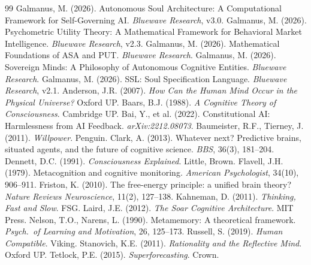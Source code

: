 \documentclass[12pt,a4paper]{article}
\theoremstyle{plain}
\theoremstyle{definition}
\theoremstyle{remark}
\begin{document}
\begin{thebibliography}{99}
 Galmanus, M. (2026). Autonomous Soul Architecture: A Computational Framework for Self-Governing AI. \textit{Bluewave Research}, v3.0.
 Galmanus, M. (2026). Psychometric Utility Theory: A Mathematical Framework for Behavioral Market Intelligence. \textit{Bluewave Research}, v2.3.
 Galmanus, M. (2026). Mathematical Foundations of ASA and PUT. \textit{Bluewave Research}.
 Galmanus, M. (2026). Sovereign Minds: A Philosophy of Autonomous Cognitive Entities. \textit{Bluewave Research}.
 Galmanus, M. (2026). SSL: Soul Specification Language. \textit{Bluewave Research}, v2.1.
 Anderson, J.R. (2007). \textit{How Can the Human Mind Occur in the Physical Universe?} Oxford UP.
 Baars, B.J. (1988). \textit{A Cognitive Theory of Consciousness}. Cambridge UP.
 Bai, Y., et al. (2022). Constitutional AI: Harmlessness from AI Feedback. \textit{arXiv:2212.08073}.
 Baumeister, R.F., Tierney, J. (2011). \textit{Willpower}. Penguin.
 Clark, A. (2013). Whatever next? Predictive brains, situated agents, and the future of cognitive science. \textit{BBS}, 36(3), 181--204.
 Dennett, D.C. (1991). \textit{Consciousness Explained}. Little, Brown.
 Flavell, J.H. (1979). Metacognition and cognitive monitoring. \textit{American Psychologist}, 34(10), 906--911.
 Friston, K. (2010). The free-energy principle: a unified brain theory? \textit{Nature Reviews Neuroscience}, 11(2), 127--138.
 Kahneman, D. (2011). \textit{Thinking, Fast and Slow}. FSG.
 Laird, J.E. (2012). \textit{The Soar Cognitive Architecture}. MIT Press.
 Nelson, T.O., Narens, L. (1990). Metamemory: A theoretical framework. \textit{Psych.\ of Learning and Motivation}, 26, 125--173.
 Russell, S. (2019). \textit{Human Compatible}. Viking.
 Stanovich, K.E. (2011). \textit{Rationality and the Reflective Mind}. Oxford UP.
 Tetlock, P.E. (2015). \textit{Superforecasting}. Crown.
\end{thebibliography}
\end{document}
